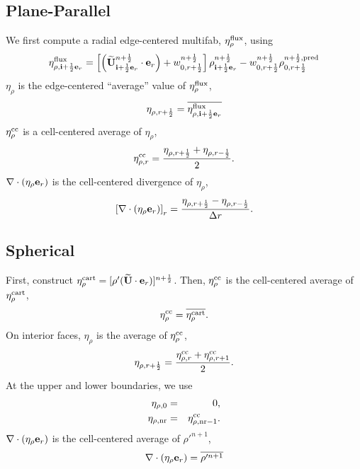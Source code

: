 \documentclass[11pt]{article}
\def\half   {\frac{1}{2}}
\def\eb         {{\bf e}}
\def\ib         {{\bf i}}
\def\Ub         {{\bf U}}
\newcommand{\Ubt}{\widetilde{\Ub}}
\def\etarho     {\eta_\rho}
\def\etarhocc   {\etarho^{\rm cc}}
\def\divetarho  {\nabla\cdot(\etarho\eb_r)}
\begin{document}
\subsection{Plane-Parallel}
We first compute a radial edge-centered multifab, $\eta_{\rho}^{\rm flux}$, using
\begin{equation}
\eta_{\rho,\ib+\half\eb_r}^{\rm flux} = \left[\left(\Ubt_{\ib+\half\eb_r}^{n+\half}\cdot\eb_r\right) + w_{0,r+\half}^{n+\half}\right] \rho_{\ib+\half\eb_r}^{n+\half} - w_{0,r+\half}^{n+\half}\rho_{0,r+\half}^{n+\half, {\rm pred}}
\end{equation}
$\etarho$ is the edge-centered ``average'' value of $\eta_{\rho}^{\rm flux}$,
\begin{equation}
\eta_{\rho,r+\half} = \overline{\eta_{\rho,\ib+\half\eb_r}^{\rm flux}}
\end{equation}
$\etarhocc$ is a cell-centered average of $\etarho$,
\begin{equation}
\eta_{\rho,r}^{\rm cc} = \frac{\eta_{\rho,r+\half} + \eta_{\rho,r-\half}}{2}.
\end{equation}
$\divetarho$ is the cell-centered divergence of $\etarho$,
\begin{equation}
\left[\divetarho\right]_r = \frac{\eta_{\rho,r+\half} - \eta_{\rho,r-\half}}{\Delta r}.
\end{equation}
\subsection{Spherical}
First, construct $\eta_{\rho}^{\rm cart} = [\rho'(\Ubt\cdot\eb_r)]^{n+\half}$.  Then, $\etarhocc$ is the cell-centered average of $\eta_{\rho}^{\rm cart}$,
\begin{equation}
\etarhocc = \overline{\eta_{\rho}^{\rm cart}}.
\end{equation}
On interior faces, $\etarho$ is the average of $\etarhocc$,
\begin{equation}
\eta_{\rho,r+\half} = \frac{\eta_{\rho,r}^{\rm cc} + \eta_{\rho,r+1}^{\rm cc}}{2}.
\end{equation}
At the upper and lower boundaries, we use
\begin{eqnarray}
\eta_{\rho,0} &=& 0, \\
\eta_{\rho,{\rm nr}} &=& \eta_{\rho,{\rm nr}-1}^{\rm cc}.
\end{eqnarray}
$\divetarho$ is the cell-centered average of $\rho'^{n+1}$,
\begin{equation}
\divetarho = \overline{\rho'^{n+1}}
\end{equation}
\end{document}
